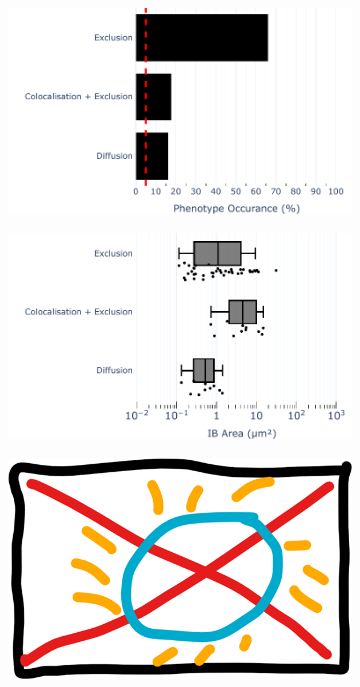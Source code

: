 \begin{figure}
    \begin{subfigure}{0.5\textwidth}
        \caption{}
        \includegraphics[width=1\linewidth]{10. Chapter 5/Figs/03. IFIT2-FLAG/03. IFIT2F/02. Infection Transfection/04. bar_bi2f_hrsv.pdf} 
    \end{subfigure}
    \begin{subfigure}{0.5\textwidth}
        \caption{}
        \includegraphics[width=1\linewidth]{10. Chapter 5/Figs/03. IFIT2-FLAG/03. IFIT2F/02. Infection Transfection/05. box_bi2f_hrsv.pdf}
    \end{subfigure}
    \begin{subfigure}{1\textwidth}
        \centering
        \caption{}
        \includegraphics[width=1\linewidth]{10. Chapter 5/Figs/00. placeholder.png}

\end{subfigure}
\end{figure}

